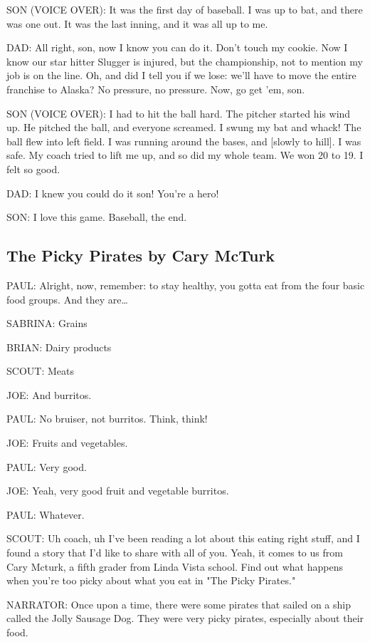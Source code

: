 SON (VOICE OVER):
It was the first day of baseball.
I was up to bat, and there was one out.
It was the last inning, and it was all up to me.

DAD:
All right, son, now I know you can do it.
Don't touch my cookie.
Now I know our star hitter Slugger is injured, but the championship, not to mention my job is on the line.
Oh, and did I tell you if we lose: we'll have to move the entire franchise to Alaska?
No pressure, no pressure.
Now, go get 'em, son.

SON (VOICE OVER):
I had to hit the ball hard.
The pitcher started his wind up.
He pitched the ball, and everyone screamed.
I swung my bat and whack!
The ball flew into left field.
I was running around the bases, and [slowly to hill].
I was safe.
My coach tried to lift me up, and so did my whole team.
We won 20 to 19.
I felt so good.

DAD:
I knew you could do it son!
You're a hero!

SON:
I love this game.
Baseball, the end.

\subsection{The Picky Pirates by Cary McTurk}

PAUL:
Alright, now, remember: to stay healthy, you gotta eat from the four basic food groups.
And they are\dots

SABRINA:
Grains

BRIAN:
Dairy products

SCOUT:
Meats

JOE:
And burritos.

PAUL:
No bruiser, not burritos.
Think, think!

JOE:
Fruits and vegetables.

PAUL:
Very good.

JOE:
Yeah, very good fruit and vegetable burritos.

PAUL:
Whatever.

SCOUT:
Uh coach, uh I've been reading a lot about this eating right stuff, and I found a story that I'd like to share with all of you.
Yeah, it comes to us from Cary Mcturk, a fifth grader from Linda Vista school.
Find out what happens when you're too picky about what you eat in "The Picky Pirates."

NARRATOR:
Once upon a time, there were some pirates that sailed on a ship called the Jolly Sausage Dog.
They were very picky pirates, especially about their food.

